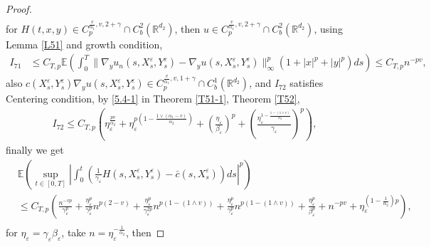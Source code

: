 \documentclass[11pt,reqno]{amsart}
\numberwithin{equation}{section}
\begin{document}
\begin{proof}
\begin{equation}
\begin{split}
	\end{split}
\end{equation}
for $H(t,x,y)\in C_{p}^{\frac{v}{\alpha_{1}},v, 2+\gamma}\cap C_{b}^{2}(\mathbb{R}^{d_{2}})$, then $u \in C_{p}^{\frac{v}{\alpha_{1}},v, 2+\gamma}\cap C_{b}^{2}(\mathbb{R}^{d_{2}})$, using Lemma \ref{L51} and growth condition,
\begin{equation}\label{5.68}
	\begin{split}
		I_{71}&\leq  C_{T,p}\mathbb{E}\left( \int^{T}_{0}\| \nabla_{y} u_{n}(s,X_{s}^{\varepsilon},Y_{s}^{\varepsilon})-\nabla_{y} u(s,X_{s}^{\varepsilon},Y_{s}^{\varepsilon})\|^{p}_{\infty}(1+|x|^{p}+|y|^{p})ds\right) \leq C_{T,p} n^{-pv},
	\end{split}
\end{equation}
also $c(X_{s}^{\varepsilon},Y_{s}^{\varepsilon})\nabla_{y} u(s,X_{s}^{\varepsilon},Y_{s}^{\varepsilon})\in C_{p}^{\frac{v}{\alpha_{1}},v, 1+\gamma}\cap C_{b}^{1}(\mathbb{R}^{d_{2}})$, and  $I_{72}$ satisfies Centering condition, by \eqref{5.4-1} in Theorem \ref{T51-1}, Theorem \ref{T52},
\begin{equation}\label{5.69}
	\begin{split}
		I_{72}\leq  C_{T,p}\left(\eta_{\varepsilon}^{\frac{pv}{\alpha_{2}}}+\eta_{\varepsilon}^{p(1-\frac{1\vee(\alpha_{1}-v)}{\alpha_{2}})}+\left( \frac{\eta_{\varepsilon}}{\beta_{\varepsilon}}\right)^{p} + \left( \frac{\eta_{\varepsilon}^{1-\frac{1-(1\wedge v)}{\alpha_{2}}}}{\gamma_{\varepsilon}}\right)^{p}\right),
	\end{split}
\end{equation}
finally we get 
\begin{equation}\label{5.70}
	\begin{aligned}
		&\mathbb{E}\left( \sup_{t\in [0,T]}\left| \int_{0}^{t}\left(  \frac{1}{\gamma_{\varepsilon}}H(s,X_{s}^{\varepsilon},Y_{s}^{\varepsilon})- \bar{c}(s,X_{s}^{\varepsilon})\right) ds\right|^{p} \right)\\
		&\leq C_{T,p}\left( \frac{n^{-vp}}{\gamma_{\varepsilon}^{p}}+\frac{\eta_{\varepsilon}^{p}}{\gamma_{\varepsilon}^{p}}n^{p(2-v)}+\frac{\eta_{\varepsilon}^{p}}{\gamma_{\varepsilon}^{2p}}n^{p(1-(1\wedge v))}+\frac{\eta_{\varepsilon}^{p}}{\gamma_{\varepsilon}^{p}}n^{p(1-(1\wedge v))}+\frac{\eta_{\varepsilon}^{p}}{\beta_{\varepsilon}^{p}}+n^{-pv}+\eta_{\varepsilon}^{(1-\frac{1}{\alpha_{2}})p} \right),\\
	\end{aligned}
\end{equation}
for $\eta_{\varepsilon}=\gamma_{\varepsilon}\beta_{\varepsilon}$,  take $n=\eta_{\varepsilon}^{-\frac{1}{\alpha_{2}}}$,  then 

\end{proof}
\end{document}
